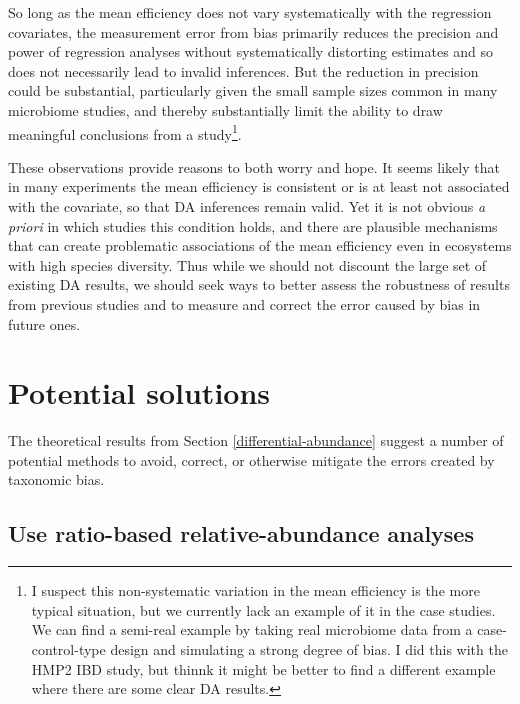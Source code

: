 \documentclass[
]{article}
\begin{document}
So long as the mean efficiency does not vary systematically with the regression covariates, the measurement error from bias primarily reduces the precision and power of regression analyses without systematically distorting estimates and so does not necessarily lead to invalid inferences.
But the reduction in precision could be substantial, particularly given the small sample sizes common in many microbiome studies, and thereby substantially limit the ability to draw meaningful conclusions from a study\footnote{I suspect this non-systematic variation in the mean efficiency is the more typical situation, but we currently lack an example of it in the case studies. We can find a semi-real example by taking real microbiome data from a case-control-type design and simulating a strong degree of bias. I did this with the HMP2 IBD study, but thinnk it might be better to find a different example where there are some clear DA results.}.

These observations provide reasons to both worry and hope.
It seems likely that in many experiments the mean efficiency is consistent or is at least not associated with the covariate, so that DA inferences remain valid.
Yet it is not obvious \emph{a priori} in which studies this condition holds, and there are plausible mechanisms that can create problematic associations of the mean efficiency even in ecosystems with high species diversity.
Thus while we should not discount the large set of existing DA results, we should seek ways to better assess the robustness of results from previous studies and to measure and correct the error caused by bias in future ones.

\hypertarget{solutions}{%
\section{Potential solutions}\label{solutions}}

The theoretical results from Section \ref{differential-abundance} suggest a number of potential methods to avoid, correct, or otherwise mitigate the errors created by taxonomic bias.

\hypertarget{use-ratio-based-relative-abundance-analyses}{%
\subsection{Use ratio-based relative-abundance analyses}\label{use-ratio-based-relative-abundance-analyses}}
\end{document}
